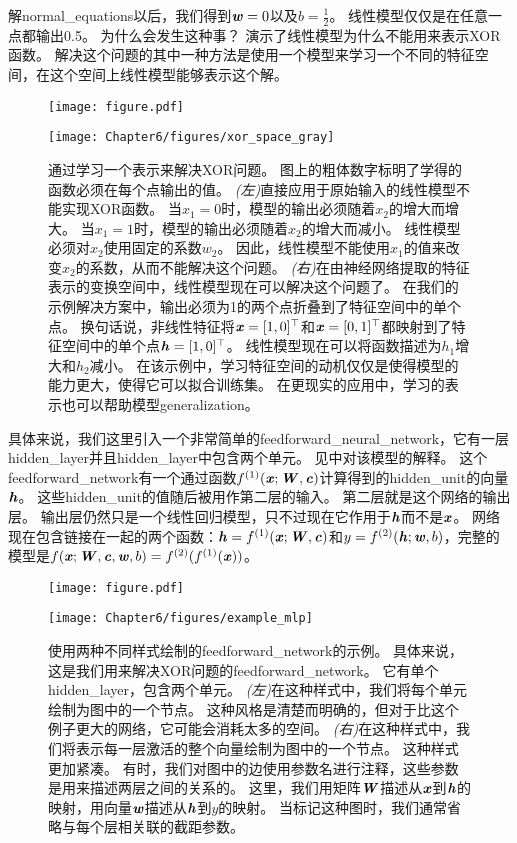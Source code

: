 解\gls{normal_equations}以后，我们得到$\boldsymbol{\mathit{w}} = 0$以及$b = \frac{1}{2}$。
线性模型仅仅是在任意一点都输出0.5。
为什么会发生这种事？
演示了线性模型为什么不能用来表示XOR函数。
解决这个问题的其中一种方法是使用一个模型来学习一个不同的特征空间，在这个空间上线性模型能够表示这个解。
\begin{figure}[!htb]
\ifOpenSource
\centerline{\texttt{[image: figure.pdf]}}
\else
\centerline{\texttt{[image: Chapter6/figures/xor\_space\_gray]}}
\fi
\captionsetup{singlelinecheck=off}
\caption{通过学习一个表示来解决XOR问题。
图上的粗体数字标明了学得的函数必须在每个点输出的值。
\emph{(左)}直接应用于原始输入的线性模型不能实现XOR函数。
当$x_1 = 0$时，模型的输出必须随着$x_2$的增大而增大。
当$x_1 = 1$时，模型的输出必须随着$x_2$的增大而减小。
线性模型必须对$x_2$使用固定的系数$w_2$。
因此，线性模型不能使用$x_1$的值来改变$x_2$的系数，从而不能解决这个问题。 
\emph{(右)}在由神经网络提取的特征表示的变换空间中，线性模型现在可以解决这个问题了。
在我们的示例解决方案中，输出必须为1的两个点折叠到了特征空间中的单个点。
换句话说，非线性特征将$\boldsymbol{\mathit{x}} = [1, 0]^\top$和$\boldsymbol{\mathit{x}} = [0, 1]^\top$都映射到了特征空间中的单个点$\boldsymbol{\mathit{h}} = [1, 0]^\top$。
线性模型现在可以将函数描述为$h_1$增大和$h_2$减小。
在该示例中，学习特征空间的动机仅仅是使得模型的能力更大，使得它可以拟合训练集。
在更现实的应用中，学习的表示也可以帮助模型\gls{generalization}。}
\label{fig:chap6_xor_space_gray}
\end{figure}


具体来说，我们这里引入一个非常简单的\gls{feedforward_neural_network}，它有一层\gls{hidden_layer}并且\gls{hidden_layer}中包含两个单元。
见中对该模型的解释。
这个\gls{feedforward_network}有一个通过函数$f^{(1)}(\boldsymbol{\mathit{x}};\boldsymbol{\mathit{W}}, \boldsymbol{\mathit{c}})$计算得到的\gls{hidden_unit}的向量$\boldsymbol{\mathit{h}}$。
这些\gls{hidden_unit}的值随后被用作第二层的输入。
第二层就是这个网络的输出层。
输出层仍然只是一个线性回归模型，只不过现在它作用于$\boldsymbol{\mathit{h}}$而不是$\boldsymbol{\mathit{x}}$。
网络现在包含链接在一起的两个函数：$\boldsymbol{\mathit{h}}=f^{(1)}(\boldsymbol{\mathit{x}}; \boldsymbol{\mathit{W}}, \boldsymbol{\mathit{c}})$和$y = f^{(2)}(\boldsymbol{\mathit{h}}; \boldsymbol{\mathit{w}}, b)$，完整的模型是$f(\boldsymbol{\mathit{x}}; \boldsymbol{\mathit{W}}, \boldsymbol{\mathit{c}}, \boldsymbol{\mathit{w}}, b) = f^{(2)}(f^{(1)}(\boldsymbol{\mathit{x}}))$。
\begin{figure}[!htb]
\ifOpenSource
\centerline{\texttt{[image: figure.pdf]}}
\else
\centerline{\texttt{[image: Chapter6/figures/example\_mlp]}}
\fi
\captionsetup{singlelinecheck=off}
\caption{使用两种不同样式绘制的\gls{feedforward_network}的示例。
具体来说，这是我们用来解决XOR问题的\gls{feedforward_network}。
它有单个\gls{hidden_layer}，包含两个单元。
\emph{(左)}在这种样式中，我们将每个单元绘制为图中的一个节点。
这种风格是清楚而明确的，但对于比这个例子更大的网络，它可能会消耗太多的空间。
\emph{(右)}在这种样式中，我们将表示每一层激活的整个向量绘制为图中的一个节点。
这种样式更加紧凑。
有时，我们对图中的边使用参数名进行注释，这些参数是用来描述两层之间的关系的。
这里，我们用矩阵$\boldsymbol{\mathit{W}}$描述从$\boldsymbol{\mathit{x}}$到$\boldsymbol{\mathit{h}}$的映射，用向量$\boldsymbol{\mathit{w}}$描述从$\boldsymbol{\mathit{h}}$到$y$的映射。
当标记这种图时，我们通常省略与每个层相关联的截距参数。}
\label{fig:chap6_example_mlp}
\end{figure}


